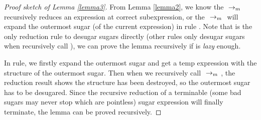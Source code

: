 \begin{proof}[Proof sketch of Lemma \ref{lemma3}]
From Lemma \ref{lemma2}, we know the $~\rightarrow_m~$ recursively reduces an expression at correct subexpression, or the $~\rightarrow_m~$ will expand the outermost sugar (of the current expression) in rule . Note that  is the only reduction rule to desugar sugars directly (other rules only desugar sugars when recursively call ), we can prove the lemma recursively if  is \emph{lazy} enough.

In  rule, we firstly expand the outermost sugar and get a temp expression with the structure of the outermost sugar. Then when we recursively call $~\rightarrow_m~$, the reduction result shows the structure has been destroyed, so the outermost sugar has to be desugared. Since the recursive reduction of a terminable (some bad sugars may never stop which are pointless) sugar expression will finally terminate, the lemma can be proved recursively.
\end{proof}
